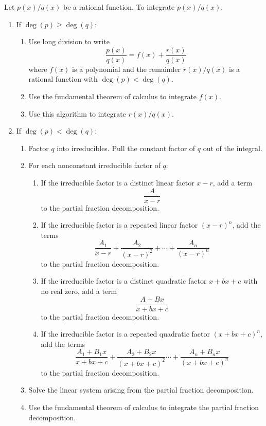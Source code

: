 \documentclass[10pt]{article}
\theoremstyle{definition}
\begin{document}
\noindent

Let $p(x)/q(x)$ be a rational function. To integrate $p(x)/q(x)$:
\begin{enumerate}
\item If $\deg(p) \geq \deg(q)$:
\begin{enumerate}
\item Use long division to write 
$$\frac{p(x)}{q(x)} = f(x) + \frac{r(x)}{q(x)}$$
where $f(x)$ is a polynomial and the remainder $r(x)/q(x)$ is a rational function with $\deg(p) < \deg(q)$.
\item Use the fundamental theorem of calculus to integrate $f(x)$.
\item Use this algorithm to integrate $r(x)/q(x)$.
\end{enumerate}
\item If $\deg(p) < \deg(q)$:
\begin{enumerate}
\item Factor $q$ into irreducibles. Pull the constant factor of $q$ out of the integral.
\item For each nonconstant irreducible factor of $q$:
\begin{enumerate}
\item If the irreducible factor is a distinct linear factor $x - r$, add a term
$$\frac{A}{x - r}$$
to the partial fraction decomposition.
\item If the irreducible factor is a repeated linear factor $(x - r)^n$, add the terms
$$\frac{A_1}{x - r} + \frac{A_2}{(x - r)^2} + \cdots + \frac{A_n}{(x - r)^n}$$
to the partial fraction decomposition.
\item If the irreducible factor is a distinct quadratic factor $x + bx + c$ with no real zero, add a term
$$\frac{A + Bx}{x + bx + c}$$
to the partial fraction decomposition.
\item If the irreducible factor is a repeated quadratic factor $(x + bx + c)^n$, add the terms 
$$\frac{A_1 + B_1x}{x + bx + c} + \frac{A_2 + B_2x}{(x + bx + c)^2} \cdots + \frac{A_n + B_n x}{(x + bx + c)^n}$$
to the partial fraction decomposition.
\end{enumerate}
\item Solve the linear system arising from the partial fraction decomposition.
\item Use the fundamental theorem of calculus to integrate the partial fraction decomposition.
\end{enumerate}
\end{enumerate}
\end{document}
